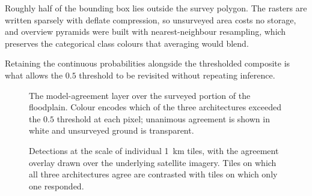 Roughly half of the bounding box lies outside the survey polygon. The rasters
are written sparsely with deflate compression, so unsurveyed area costs no
storage, and overview pyramids were built with nearest-neighbour resampling,
which preserves the categorical class colours that averaging would blend.

Retaining the continuous probabilities alongside the thresholded composite is
what allows the $0.5$ threshold to be revisited without repeating inference.

\begin{figure}[!ht]
\centering
\caption[Model-agreement layer over the survey area]{The model-agreement layer
over the surveyed portion of the floodplain. Colour encodes which of the three
architectures exceeded the $0.5$ threshold at each pixel; unanimous agreement is
shown in white and unsurveyed ground is transparent.}
\label{fig:disc-overview}
\end{figure}

\begin{figure}[!ht]
\centering
\caption[Detections at tile scale]{Detections at the scale of individual 1~km
tiles, with the agreement overlay drawn over the underlying satellite imagery.
Tiles on which all three architectures agree are contrasted with tiles on which
only one responded.}
\label{fig:disc-candidates}
\end{figure}

